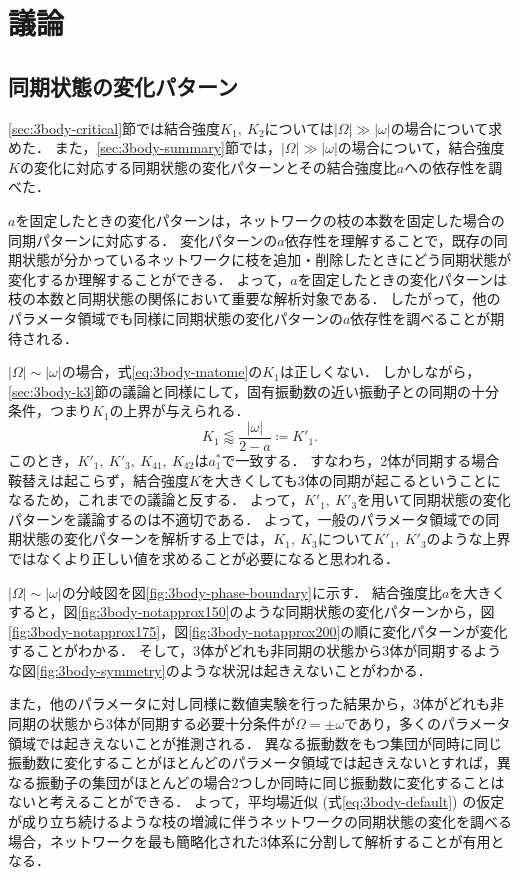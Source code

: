 \documentclass[../main]{subfiles}
\begin{document}
\section{議論}
\label{sec:3body-discussion}
\subsection{同期状態の変化パターン}
\ref{sec:3body-critical}節では結合強度$K_1,\ K_2$については$|\Omega|\gg|\omega|$の場合について求めた．
また，\ref{sec:3body-summary}節では，$|\Omega|\gg|\omega|$の場合について，結合強度$K$の変化に対応する同期状態の変化パターンとその結合強度比$a$への依存性を調べた．

$a$を固定したときの変化パターンは，ネットワークの枝の本数を固定した場合の同期パターンに対応する．
変化パターンの$a$依存性を理解することで，既存の同期状態が分かっているネットワークに枝を追加・削除したときにどう同期状態が変化するか理解することができる．
よって，$a$を固定したときの変化パターンは枝の本数と同期状態の関係において重要な解析対象である．
したがって，他のパラメータ領域でも同様に同期状態の変化パターンの$a$依存性を調べることが期待される．

$|\Omega|\sim|\omega|$の場合，式\eqref{eq:3body-matome}の$K_1$は正しくない．
しかしながら，\ref{sec:3body-k3}節の議論と同様にして，固有振動数の近い振動子との同期の十分条件，つまり$K_1$の上界が与えられる．
\begin{equation}
    \label{K1-approx-dash}
    K_1\lessapprox\frac{|\omega|}{2-a}\coloneqq K'_1.
\end{equation}
このとき，$K'_1,\ K'_3,\ K_{41},\ K_{42}$は$a^\ast_1$で一致する．
すなわち，2体が同期する場合鞍替えは起こらず，結合強度$K$を大きくしても3体の同期が起こるということになるため，これまでの議論と反する．
よって，$K'_1,\ K'_3$を用いて同期状態の変化パターンを議論するのは不適切である．
よって，一般のパラメータ領域での同期状態の変化パターンを解析する上では，$K_1,\ K_3$について$K'_1,\ K'_3$のような上界ではなくより正しい値を求めることが必要になると思われる．

$|\Omega|\sim|\omega|$の分岐図を図\ref{fig:3body-phase-boundary}に示す．
結合強度比$a$を大きくすると，図\ref{fig:3body-notapprox150}のような同期状態の変化パターンから，図\ref{fig:3body-notapprox175}，図\ref{fig:3body-notapprox200}の順に変化パターンが変化することがわかる．
そして，3体がどれも非同期の状態から3体が同期するような図\ref{fig:3body-symmetry}のような状況は起きえないことがわかる．

また，他のパラメータに対し同様に数値実験を行った結果から，3体がどれも非同期の状態から3体が同期する必要十分条件が$\Omega=\pm\omega$であり，多くのパラメータ領域では起きえないことが推測される．
異なる振動数をもつ集団が同時に同じ振動数に変化することがほとんどのパラメータ領域では起きえないとすれば，異なる振動子の集団がほとんどの場合2つしか同時に同じ振動数に変化することはないと考えることができる．
よって，平均場近似 (式\eqref{eq:3body-default}) の仮定が成り立ち続けるような枝の増減に伴うネットワークの同期状態の変化を調べる場合，ネットワークを最も簡略化された3体系に分割して解析することが有用となる．
\end{document}
